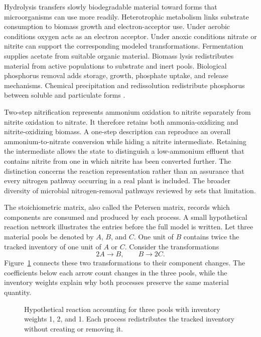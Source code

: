 Hydrolysis transfers slowly biodegradable material toward forms that microorganisms can use more readily. Heterotrophic metabolism links substrate consumption to biomass growth and electron-acceptor use. Under aerobic conditions oxygen acts as an electron acceptor. Under anoxic conditions nitrate or nitrite can support the corresponding modeled transformations. Fermentation supplies acetate from suitable organic material. Biomass lysis redistributes material from active populations to substrate and inert pools. Biological phosphorus removal adds storage, growth, phosphate uptake, and release mechanisms. Chemical precipitation and redissolution redistribute phosphorus between soluble and particulate forms \citep{Henze2006,Guerrero2011}.

Two-step nitrification represents ammonium oxidation to nitrite separately from nitrite oxidation to nitrate. It therefore retains both ammonia-oxidizing and nitrite-oxidizing biomass. A one-step description can reproduce an overall ammonium-to-nitrate conversion while hiding a nitrite intermediate. Retaining the intermediate allows the state to distinguish a low-ammonium effluent that contains nitrite from one in which nitrite has been converted further. The distinction concerns the reaction representation rather than an assurance that every nitrogen pathway occurring in a real plant is included. The broader diversity of microbial nitrogen-removal pathways reviewed by \citet{Duan2022} sets that limitation.

The stoichiometric matrix, also called the Petersen matrix, records which components are consumed and produced by each process. A small hypothetical reaction network illustrates the entries before the full model is written. Let three material pools be denoted by $A$, $B$, and $C$. One unit of $B$ contains twice the tracked inventory of one unit of $A$ or $C$. Consider the transformations
\[
2A\longrightarrow B,\qquad B\longrightarrow2C.
\]
Figure~\ref{fig:reactor_reaction_accounting} connects these two transformations to their component changes. The coefficients below each arrow count changes in the three pools, while the inventory weights explain why both processes preserve the same material quantity.

\begin{figure}[htbp]
\centering

\caption{Hypothetical reaction accounting for three pools with inventory weights 1, 2, and 1. Each process redistributes the tracked inventory without creating or removing it.}
\label{fig:reactor_reaction_accounting}
\end{figure}

